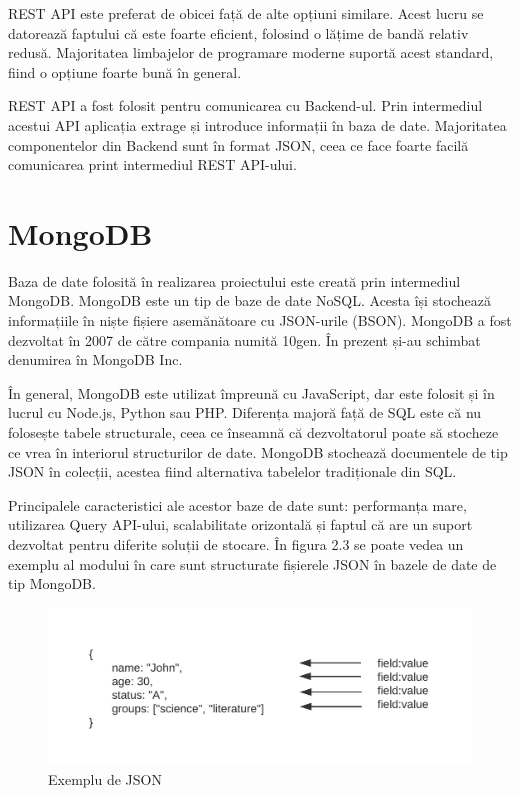 \documentclass[12pt,a4paper]{report}
\theoremstyle{definition}
\theoremstyle{remark}
\begin{document}
REST API este preferat de obicei față de alte opțiuni similare. Acest lucru se datorează faptului că este foarte eficient, folosind o lățime de bandă relativ redusă. Majoritatea limbajelor de programare moderne suportă acest standard, fiind o opțiune foarte bună în general. \cite{restapi:2020} 

REST API a fost folosit pentru comunicarea cu Backend-ul. Prin intermediul acestui API aplicația extrage și introduce informații în baza de date. Majoritatea componentelor din Backend sunt în format JSON, ceea ce face foarte facilă comunicarea print intermediul REST API-ului. 
\newpage
\section{MongoDB}
Baza de date folosită în realizarea proiectului este creată prin intermediul MongoDB. MongoDB este un tip de baze de date NoSQL. Acesta își stochează informațiile în niște fișiere asemănătoare cu JSON-urile (BSON). MongoDB a fost dezvoltat în 2007 de către compania numită 10gen. În prezent și-au schimbat denumirea în MongoDB Inc. 

În general, MongoDB este utilizat împreună cu JavaScript, dar este folosit și în lucrul cu Node.js, Python sau PHP. Diferența majoră față de SQL este că nu folosește tabele structurale, ceea ce înseamnă că dezvoltatorul poate să stocheze ce vrea în interiorul structurilor de date. MongoDB stochează documentele de tip JSON în colecții, acestea fiind alternativa tabelelor tradiționale din SQL. 

Principalele caracteristici ale acestor baze de date sunt: performanța mare, utilizarea Query API-ului, scalabilitate orizontală și faptul că are un suport dezvoltat pentru diferite soluții de stocare. În figura 2.3 se poate vedea un exemplu al modului în care sunt structurate fișierele JSON în bazele de date de tip MongoDB. \cite{mongodb1:2020} \cite{mongodb2:2020} \cite{mongodb3:2023}
\begin{center}
\begin{figure}[H]
    	\centering
    	\includegraphics[width = 1\textwidth]{images/mongodb}
	\caption{Exemplu de JSON}
\end{figure}
\end{center}
\end{document}
